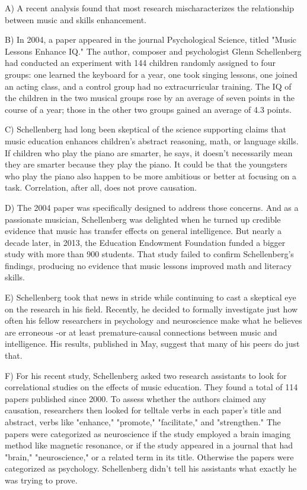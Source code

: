 \documentclass[UTF8,11pt]{ctexart}
\begin{document}
A) A recent analysis found that most research mischaracterizes the relationship between music and skills enhancement.


B) In 2004, a paper appeared in the journal Psychological Science, titled "Music Lessons Enhance IQ." The author, composer and psychologist Glenn Schellenberg had conducted an experiment with 144 children randomly assigned to four groups: one learned the keyboard for a year, one took singing lessons, one joined an acting class, and a control group had no extracurricular training. The IQ of the children in the two musical groups rose by an average of seven points in the course of a year; those in the other two groups gained an average of 4.3 points.


C) Schellenberg had long been skeptical of the science supporting claims that music education enhances children's abstract reasoning, math, or language skills. If children who play the piano are smarter, he says, it doesn't necessarily mean they are smarter because they play the piano. It could be that the youngsters who play the piano also happen to be more ambitious or better at focusing on a task. Correlation, after all, does not prove causation.


D) The 2004 paper was specifically designed to address those concerns. And as a passionate musician, Schellenberg was delighted when he turned up credible evidence that music has transfer effects on general intelligence. But nearly a decade later, in 2013, the Education Endowment Foundation funded a bigger study with more than 900 students. That study failed to confirm Schellenberg's findings, producing no evidence that music lessons improved math and literacy skills.


E) Schellenberg took that news in stride while continuing to cast a skeptical eye on the research in his field. Recently, he decided to formally investigate just how often his fellow researchers in psychology and neuroscience make what he believes are erroneous -or at least premature-causal connections between music and intelligence. His results, published in May, suggest that many of his peers do just that.


F) For his recent study, Schellenberg asked two research assistants to look for correlational studies on the effects of music education. They found a total of 114 papers published since 2000. To assess whether the authors claimed any causation, researchers then looked for telltale verbs in each paper's title and abstract, verbs like "enhance," "promote," "facilitate," and "strengthen." The papers were categorized as neuroscience if the study employed a brain imaging method like magnetic resonance, or if the study appeared in a journal that had "brain," "neuroscience," or a related term in its title. Otherwise the papers were categorized as psychology. Schellenberg didn't tell his assistants what exactly he was trying to prove.
\end{document}
